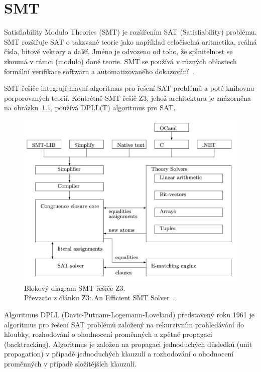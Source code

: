 \chapter{SMT}
\label{ch:smt}

Satisfiability Modulo Theories (SMT) je rozšířením SAT (Satisfiability) problému.
SMT rozšiřuje SAT o takzvané teorie jako například celočíselná aritmetika, reálná čísla, bitové vektory a další.
Jméno je odvozeno od toho, že splnitelnost se zkoumá v rámci (modulo) dané teorie.
SMT se používá v různých oblastech formální verifikace softwaru a automatizovaného dokazování~\cite{SMT}.

SMT řešiče integrují hlavní algoritmus pro řešení SAT problémů a poté knihovnu porporovaných teorií.
Kontrétně SMT řešič Z3, jehož architektura je znázorněna na obrázku~\ref{fig:z3-block-diagram},
používá DPLL(T) algoritmus pro SAT\@.

\begin{figure}[H]
    \centering
    \includegraphics[width=.85\linewidth]{images/smt-structure}
    \caption{
        Blokový diagram SMT řešiče Z3. \\
        Převzato z článku Z3: An Eﬃcient SMT Solver~\cite{Z3}.
    }
    \label{fig:z3-block-diagram}
\end{figure}

Algoritmus DPLL (Davis-Putnam-Logemann-Loveland) představený roku 1961
je algoritmus pro řešení SAT problémů
založený na rekurzivním prohledávání do hloubky, rozhodování o ohodnocení proměnných a zpětné propagaci (backtracking).
Algoritmus je založen na propagaci jednoduchých důsledků (unit propagation) v případě jednoduchých klauzulí
a rozhodování o ohodnocení proměnných v případě složitějších klauzulí.

